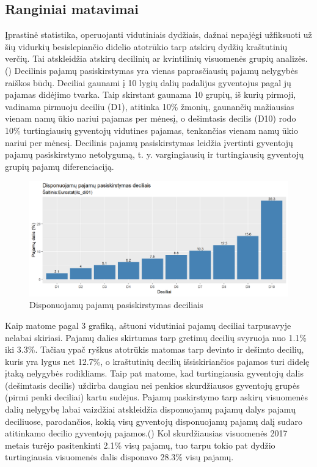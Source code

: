\documentclass[12pt,a4paper,titlepage]{article}
\begin{document}
\subsection{Ranginiai matavimai}
Įprastinė statistika, operuojanti vidutiniais dydžiais, dažnai nepajėgi užfiksuoti už šių vidurkių besislepiančio didelio
atotrūkio tarp atskirų dydžių kraštutinių verčių. Tai atskleidžia
atskirų decilinių ar kvintilinių visuomenės grupių analizės. (\cite{lisauskaite2010lietuvos})
Decilinis pajamų pasiskirstymas yra vienas paprasčiausių pajamų nelygybės raiškos būdų. Deciliai gaunami į 10 lygių dalių padalijus gyventojus pagal jų pajamas didėjimo tvarka. Taip skirstant gaunama 10 grupių, iš kurių pirmoji, vadinama pirmuoju deciliu (D1), atitinka 10\% žmonių, gaunančių mažiausias vienam namų ūkio nariui pajamas per mėnesį, o dešimtasis decilis (D10) rodo 10\% turtingiausių gyventojų vidutines pajamas, tenkančias vienam namų ūkio nariui per mėnesį. Decilinis pajamų pasiskirstymas leidžia įvertinti gyventojų pajamų pasiskirstymo netolygumą, t. y. vargingiausių ir turtingiausių gyventojų grupių pajamų diferenciaciją. 
\begin{figure}[H]
\includegraphics[scale=0.7]{LTdeciles2017.png}
\caption{Disponuojamų pajamų pasiskirstymas deciliais}
\end{figure}
Kaip matome pagal 3 grafiką, aštuoni vidutiniai pajamų deciliai tarpusavyje nelabai skiriasi. Pajamų dalies skirtumas tarp gretimų decilių svyruoja nuo 1.1\% iki 3.3\%. Tačiau ypač ryškus atotrūkis matomas tarp devinto ir dešimto decilių, kuris yra lygus net 12.7\%, o kraštutinių decilių išsiskiriančios pajamos turi didelę įtaką nelygybės rodikliams. Taip pat matome, kad turtingiausia gyventojų dalis (dešimtasis decilis) uždirba daugiau nei penkios skurdžiausos gyventojų grupės (pirmi penki deciliai) kartu sudėjus. Pajamų paskirstymo tarp askirų visuomenės dalių nelygybę labai vaizdžiai atskleidžia disponuojamų pajamų dalys pajamų deciliuose, parodančios, kokią visų gyventojų disponuojamų pajamų dalį sudaro atitinkamo decilio gyventojų pajamos.(\cite{lazutka2003gyventojku}) Kol skurdžiausias visuomenės 2017 metais turėjo pasitenkinti 2.1\% visų pajamų, tuo tarpu tokio pat dydžio turtingiausia visuomenės dalis disponavo 28.3\% visų pajamų.
\end{document}
